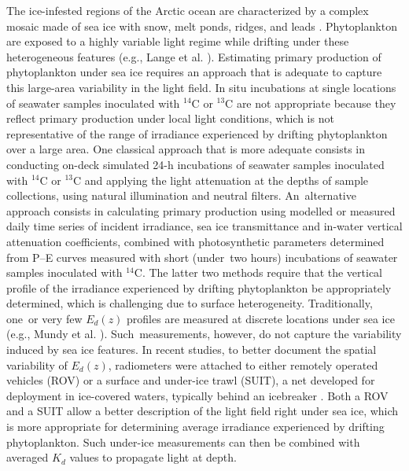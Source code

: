 \documentclass[applsci,article,accept,moreauthors,pdftex,10pt,a4paper]{Definitions/mdpi}
\newcommand{\ked}{\ensuremath{K_{d}}}
\newcommand{\edz}{\ensuremath{{E_d(z)}}}
\begin{document}
The ice-infested regions of the Arctic ocean are characterized by a complex mosaic made of sea ice with snow, melt ponds, ridges, and leads \citep{Nicolaus2013, Katlein2015, Katlein2016}. Phytoplankton are exposed to a highly variable light regime while drifting under these heterogeneous features (e.g., Lange et al. \cite{Lange2017}). Estimating primary production of phytoplankton under sea ice requires an approach that is adequate to capture this large-area variability in the light field. In situ incubations at single locations of seawater samples inoculated with $^{14}$C or $^{13}$C are not appropriate because they reflect primary production under local light conditions, which is not representative of the range of irradiance experienced by drifting phytoplankton over a large area. One classical approach that is more adequate consists in conducting on-deck simulated 24-h incubations of seawater samples inoculated with $^{14}$C or $^{13}$C and applying the light attenuation at the depths of sample collections, using natural illumination and neutral filters. An~alternative approach consists in calculating primary production using modelled or measured daily time series of incident irradiance, sea ice transmittance and in-water vertical attenuation coefficients, combined with photosynthetic parameters determined from P--E curves measured with short (under~two hours) incubations of seawater samples inoculated with $^{14}$C. The latter two methods require that the vertical profile of the irradiance experienced by drifting phytoplankton be appropriately determined, which is challenging due to surface heterogeneity. Traditionally, one~or very few \edz{} profiles are measured at discrete locations under sea ice (e.g., Mundy et al. \cite{Mundy2009}). Such~measurements, however, do not capture the variability induced by sea ice features. In recent studies, to better document the spatial variability of \edz{}, radiometers were attached to either remotely operated vehicles (ROV) \citep{Katlein2015} or a surface and under-ice trawl (SUIT), a net developed for deployment in ice-covered waters, typically behind an icebreaker \citep{Lange2017}. Both a ROV and a SUIT allow a better description of the light field right under sea ice, which is more appropriate for determining average irradiance experienced by drifting phytoplankton. Such under-ice measurements can then be combined with averaged \ked{} values to propagate light at depth.
\end{document}
